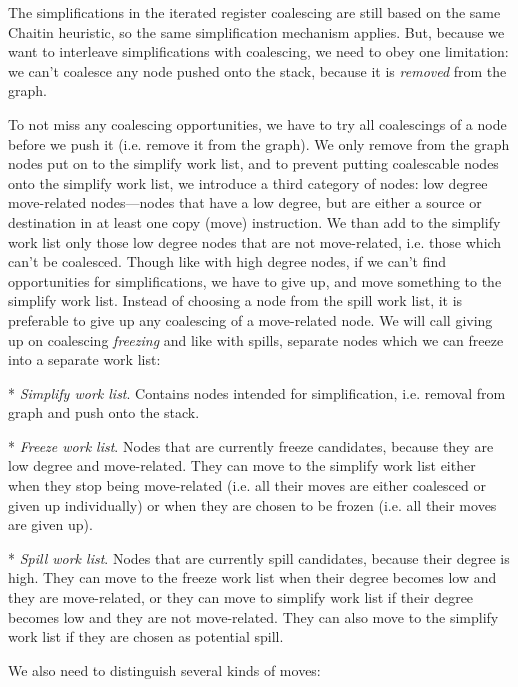 The simplifications in the iterated register coalescing are still based on the
same Chaitin heuristic, so the same simplification mechanism applies. But,
because we want to interleave simplifications with coalescing, we need to obey
one limitation: we can't coalesce any node pushed onto the stack, because it is
{\em removed} from the graph.


To not miss any coalescing opportunities, we have to try all coalescings of a
node before we push it (i.e. remove it from the graph). We only remove from the
graph nodes put on to the simplify work list, and to prevent putting coalescable
nodes onto the simplify work list, we introduce a third category of nodes: low
degree move-related nodes---nodes that have a low degree, but are either a source
or destination in at least one copy (move) instruction. We than add to the simplify
work list only those low degree nodes that are not move-related, i.e. those
which can't be
coalesced. Though like with high degree nodes, if we can't find opportunities
for simplifications, we have to give up, and move something to the simplify work
list. Instead of choosing a node from the spill work list, it is preferable to
give up any coalescing of a move-related node. We will call giving up on
coalescing {\em freezing} and like with spills, separate nodes which we can
freeze into a separate work list:

\begitems
* {\em Simplify work list}. Contains nodes intended for simplification, i.e. removal
from graph and push onto the stack.

* {\em Freeze work list}. Nodes that are currently freeze candidates, because
they are low degree and move-related. They can move to the simplify work list either when they
stop being move-related (i.e. all their moves are either coalesced or given up
individually) or when they are chosen to be frozen (i.e. all their moves are
given up).

* {\em Spill work list}. Nodes that are currently spill candidates, because their
degree is high. They can move to the freeze work list when their degree becomes
low and they are move-related, or they can move to simplify work list if their
degree becomes low and they are not move-related. They can also move to the
simplify work list if they are chosen as potential spill.
\enditems

We also need to distinguish several kinds of moves:

\begitems

